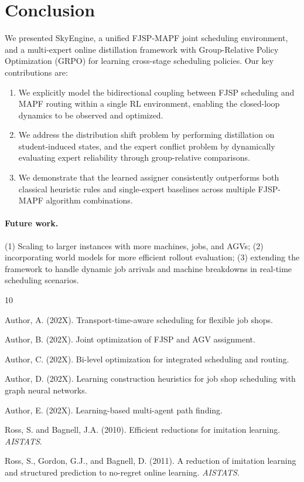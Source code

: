 \documentclass[11pt,a4paper]{article}
\begin{document}
\section{Conclusion}
\label{sec:conclusion}

We presented SkyEngine, a unified FJSP-MAPF joint scheduling environment, and a multi-expert online distillation framework with Group-Relative Policy Optimization (GRPO) for learning cross-stage scheduling policies. Our key contributions are:

\begin{enumerate}[leftmargin=*]
    \item We explicitly model the bidirectional coupling between FJSP scheduling and MAPF routing within a single RL environment, enabling the closed-loop dynamics to be observed and optimized.
    \item We address the distribution shift problem by performing distillation on student-induced states, and the expert conflict problem by dynamically evaluating expert reliability through group-relative comparisons.
    \item We demonstrate that the learned assigner consistently outperforms both classical heuristic rules and single-expert baselines across multiple FJSP-MAPF algorithm combinations.
\end{enumerate}

\paragraph{Future work.}
(1) Scaling to larger instances with more machines, jobs, and AGVs; (2) incorporating world models for more efficient rollout evaluation; (3) extending the framework to handle dynamic job arrivals and machine breakdowns in real-time scheduling scenarios.



\begin{thebibliography}{10}

Author, A. (202X). Transport-time-aware scheduling for flexible job shops.

Author, B. (202X). Joint optimization of FJSP and AGV assignment.

Author, C. (202X). Bi-level optimization for integrated scheduling and routing.

Author, D. (202X). Learning construction heuristics for job shop scheduling with graph neural networks.

Author, E. (202X). Learning-based multi-agent path finding.

Ross, S. and Bagnell, J.A. (2010). Efficient reductions for imitation learning. \emph{AISTATS}.

Ross, S., Gordon, G.J., and Bagnell, D. (2011). A reduction of imitation learning and structured prediction to no-regret online learning. \emph{AISTATS}.

\end{thebibliography}
\end{document}
